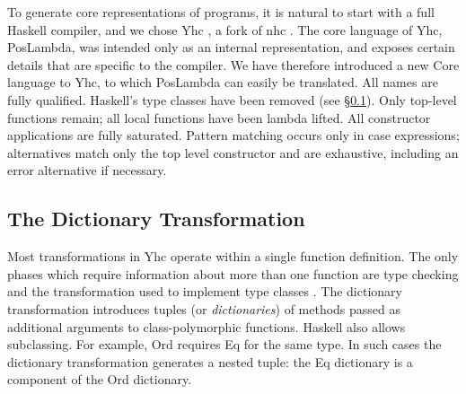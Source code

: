\documentclass[preprint]{sigplanconf}
\let\cite=\citep
\newcommand{\C}[1]{\textsf{#1}}
\begin{document}
\begin{comment}
-- a simple variant of lambda calculus without types, but with source position information. Yhc works by applying basic desugaring transformations, without optimisation. This simplicity ensures the generated PosLambda is close to the original Haskell in its structure. Each top-level function in a source file maps to a top-level function in the generated PosLambda, retaining the same name.

However, PosLambda has constructs that have no direct representation in Haskell. For example, there is a FatBar construct \cite{spj:implementation}, used for compiling pattern matches which require fall through behaviour. The PosLambda language
\end{comment}

To generate core representations of programs, it is natural to start with a full Haskell compiler, and we chose Yhc \citep{Yhc}, a fork of nhc \citep{nhc}. The core language of Yhc, PosLambda, was intended only as an internal representation, and exposes certain details that are specific to the compiler. We have therefore introduced a new Core language to Yhc, to which PosLambda can easily be translated. All names are fully qualified. Haskell's type classes have been removed (see \S\ref{sec:dict}). Only top-level functions remain; all local functions have been lambda lifted. All constructor applications are fully saturated. Pattern matching occurs only in case expressions; alternatives match only the top level constructor and are exhaustive, including an \C{error} alternative if necessary.


\subsection{The Dictionary Transformation}
\label{sec:dict}

Most transformations in Yhc operate within a single function definition. The only phases which require information about more than one function are type checking and the transformation used to implement type classes \citep{wadler:type_classes}. The dictionary transformation introduces tuples (or \textit{dictionaries}) of methods passed as additional arguments to class-polymorphic functions. Haskell also allows subclassing. For example, \C{Ord} requires \C{Eq} for the same type. In such cases the dictionary transformation generates a nested tuple: the \C{Eq} dictionary is a component of the \C{Ord} dictionary.
\end{document}
